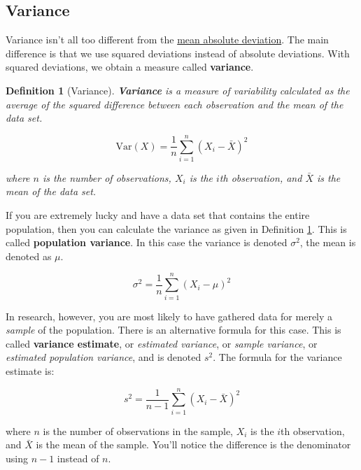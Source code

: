 \documentclass[
  11pt,
]{book}
\theoremstyle{indenteddefinition}
\newtheorem{definition}{Definition}[chapter]
\theoremstyle{indenteddefinition}
\theoremstyle{definition}
\theoremstyle{definition}
\theoremstyle{remark}
\begin{document}
\hypertarget{variance}{%
\subsection{Variance}\label{variance}}

Variance isn't all too different from the \protect\hyperlink{aad}{mean absolute deviation}. The main difference is that we use squared deviations instead of absolute deviations. With squared deviations, we obtain a measure called \textbf{variance}.

\begin{definition}[Variance]
\protect\hypertarget{def:defVar}{}\label{def:defVar}\textbf{Variance} is a measure of variability calculated as the average of the \emph{squared difference} between each observation and the \emph{mean} of the data set.

\[
\mbox{Var}(X) = \frac{1}{n} \sum_{i=1}^n (X_i - \bar{X})^2
\]

where \(n\) is the number of observations, \(X_i\) is the \(i\)th observation, and \(\bar{X}\) is the mean of the data set.
\end{definition}

\hypertarget{calloutVar}{}
\begin{callout}

If you are extremely lucky and have a data set that contains the entire population, then you can calculate the variance as given in Definition \ref{def:defVar}. This is called \textbf{population variance}. In this case the variance is denoted \(\sigma^2\), the mean is denoted as \(\mu\).

\[
\sigma^2 = \frac{1}{n} \sum_{i=1}^n (X_i - \mu)^2
\]

In research, however, you are most likely to have gathered data for merely a \emph{sample} of the population. There is an alternative formula for this case. This is called \textbf{variance estimate}, or \emph{estimated variance}, or \emph{sample variance}, or \emph{estimated population variance}, and is denoted \(s^2\). The formula for the variance estimate is:

\[
s^2 = \frac{1}{n-1} \sum_{i=1}^n (X_i - \bar{X})^2
\]

where \(n\) is the number of observations in the sample, \(X_i\) is the \(i\)th observation, and \(\bar{X}\) is the mean of the sample. You'll notice the difference is the denominator using \(n-1\) instead of \(n\).

\end{callout}
\end{document}
